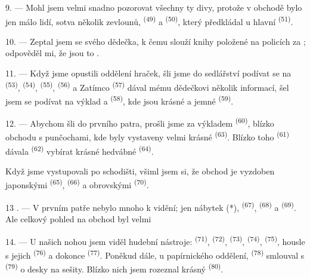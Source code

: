 9. --- Mohl jsem velmi snadno pozorovat všechny ty divy, protože v obchodě bylo jen málo lidí,
sotva několik zevlounů,  \textsuperscript{(49)} a
 \textsuperscript{(50)}, který předkládal  u hlavní
 \textsuperscript{(51)}.

10. --- Zeptal jsem se svého dědečka, k čemu slouží knihy položené na policích za
; odpověděl mi, že jsou to .

\VUsaut{3.6mm}
\VUsaut{2.8mm}

11. --- Když jsme opustili oddělení hraček, šli jsme do sedlářství podívat se na
 \textsuperscript{(53)},  \textsuperscript{(54)},
 \textsuperscript{(55)},  \textsuperscript{(56)} a
 Zatímco  \textsuperscript{(57)} dával
mému dědečkovi několik informací, šel jsem se podívat na výklad  a
 \textsuperscript{(58)}, kde jsou krásné  a
jemné  \textsuperscript{(59)}.

12. --- Abychom šli do prvního patra, prošli jsme za výkladem 
\textsuperscript{(60)}, blízko obchodu s punčochami, kde byly vystaveny velmi krásné
 \textsuperscript{(63)}. Blízko toho 
\textsuperscript{(61)} dávala  \textsuperscript{(62)} vybírat krásné hedvábné
 \textsuperscript{(64)}.

Když jsme vystupovali po schodišti, všiml jsem si, že obchod je vyzdoben japonskými
 \textsuperscript{(65)},  \textsuperscript{(66)} a
obrovskými  \textsuperscript{(70)}.

13 . --- V prvním patře nebylo mnoho k vidění; jen nábytek (*), 
\textsuperscript{(67)},  \textsuperscript{(68)} a
 \textsuperscript{(69)}. Ale celkový pohled na obchod byl velmi

14. --- U našich nohou jsem viděl hudební nástroje:  \textsuperscript{(71)},
 \textsuperscript{(72)},  \textsuperscript{(73)},
 \textsuperscript{(74)},
 \textsuperscript{(75)}, housle s jejich 
\textsuperscript{(76)} a dokonce  \textsuperscript{(77)}. Poněkud dále, u
papírnického oddělení,  \textsuperscript{(78)} smlouval s
 \textsuperscript{(79)} o desky na sešity. Blízko nich jsem rozeznal
krásný  \textsuperscript{(80)}.

